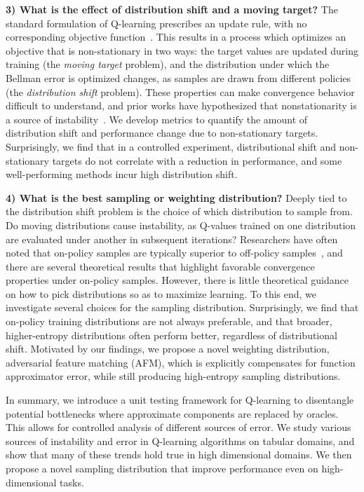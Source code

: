 \textbf{3) What is the effect of distribution shift and a moving target?}
The standard formulation of Q-learning prescribes an update rule, with no corresponding objective function~\citep{Sutton09b}. This results in a process which optimizes an objective that is non-stationary in two ways: the target values are updated during training (the \emph{moving target} problem), and the distribution under which the Bellman error is optimized changes, as samples are drawn from different policies (the \emph{distribution shift} problem). These properties can make convergence behavior difficult to understand, and prior works have hypothesized that nonstationarity is a source of instability~\citep{Mnih2015, Lillicrap2015}. {We develop metrics to quantify the amount of distribution shift and performance change due to non-stationary targets. Surprisingly, we find that in a controlled experiment, distributional shift and non-stationary targets do not correlate with a reduction in performance, and some well-performing methods incur high distribution shift.}

\textbf{4) What is the best sampling or weighting distribution?}
Deeply tied to the distribution shift problem is the choice of which distribution to sample from. Do moving distributions cause instability, as Q-values trained on one distribution are evaluated under another in subsequent iterations?
Researchers have often noted that on-policy samples are typically superior to off-policy samples~\citep{suttonrlbook}, and there are several theoretical results that highlight favorable convergence properties under on-policy samples. However, there is little theoretical guidance on how to pick distributions so as to maximize learning. To this end, we investigate several choices for the sampling distribution. {Surprisingly, we find that on-policy training distributions are not always preferable, and that broader, higher-entropy distributions often perform better, regardless of distributional shift. Motivated by our findings, we propose a novel weighting distribution, adversarial feature matching (AFM), which is explicitly compensates for function approximator error, while still producing high-entropy sampling distributions.}

In summary, we introduce a unit testing framework for Q-learning to disentangle potential bottlenecks where approximate components are replaced by oracles. This allows for controlled analysis of different sources of error. We study various sources of instability and error in Q-learning algorithms on tabular domains, and show that many of these trends hold true in high dimensional domains. We then propose a novel sampling distribution that improve performance even on high-dimensional tasks. %
